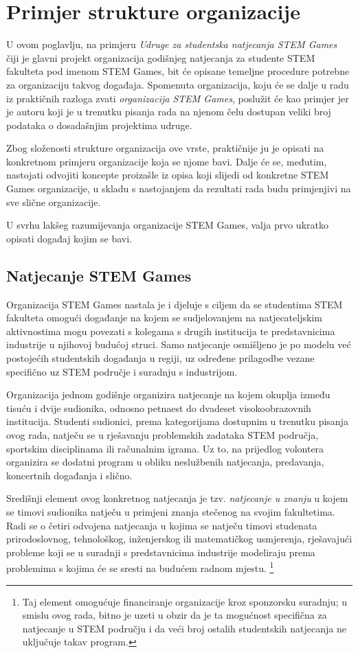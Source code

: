 \documentclass[times, utf8, diplomski]{fer}
\begin{document}
\chapter{Primjer strukture organizacije}

U ovom poglavlju, na primjeru \emph{Udruge za studentska natjecanja STEM Games}
čiji je glavni projekt organizacija godišnjeg natjecanja za studente STEM
fakulteta pod imenom STEM Games, bit će opisane temeljne procedure potrebne za
organizaciju takvog događaja. Spomenuta organizacija, koju će se dalje u radu iz
praktičnih razloga zvati \emph{organizacija STEM Games}, poslužit će kao primjer
jer je autoru koji je u trenutku pisanja rada na njenom čelu dostupan veliki
broj podataka o dosadašnjim projektima udruge.

Zbog složenosti strukture organizacija ove vrste, praktičnije ju je opisati na
konkretnom primjeru organizacije koja se njome bavi. Dalje će se, međutim,
nastojati odvojiti koncepte proizašle iz opisa koji slijedi od konkretne STEM
Games organizacije, u skladu s nastojanjem da rezultati rada budu primjenjivi na
sve slične organizacije.

U svrhu lakšeg razumijevanja organizacije STEM Games, valja prvo ukratko opisati
događaj kojim se bavi.

\section{Natjecanje STEM Games}

Organizacija STEM Games nastala je i djeluje s ciljem da se studentima STEM
fakulteta omogući događanje na kojem se sudjelovanjem na natjecateljskim
aktivnostima mogu povezati s kolegama s drugih institucija te predstavnicima
industrije u njihovoj budućoj struci. Samo natjecanje osmišljeno je po modelu
već postojećih studentskih događanja u regiji, uz određene prilagodbe vezane
specifično uz STEM područje i suradnju s industrijom.

Organizacija jednom godišnje organizira natjecanje na kojem okuplja između
tisuću i dvije sudionika, odnosno petnaest do dvadeset visokoobrazovnih
institucija.  Studenti sudionici, prema kategorijama dostupnim u trenutku
pisanja ovog rada, natječu se u rješavanju problemskih zadataka STEM područja,
sportskim disciplinama ili računalnim igrama. Uz to, na prijedlog volontera
organizira se dodatni program u obliku neslužbenih natjecanja, predavanja,
koncertnih događanja i slično.

Središnji element ovog konkretnog natjecanja je tzv. \emph{natjecanje u znanju}
u kojem se timovi sudionika natječu u primjeni znanja stečenog na svojim
fakultetima. Radi se o četiri odvojena natjecanja u kojima se natječu timovi
studenata prirodoslovnog, tehnološkog, inženjerskog ili matematičkog usmjerenja,
rješavajući probleme koji se u suradnji s predstavnicima industrije modeliraju
prema problemima s kojima će se sresti na budućem radnom mjestu.  \footnote{Taj
    element omogućuje financiranje organizacije kroz sponzorsku suradnju; u
    smislu ovog rada, bitno je uzeti u obzir da je ta mogućnost specifična za
    natjecanje u STEM području i da veći broj ostalih studentskih natjecanja ne
uključuje takav program.}
\end{document}
